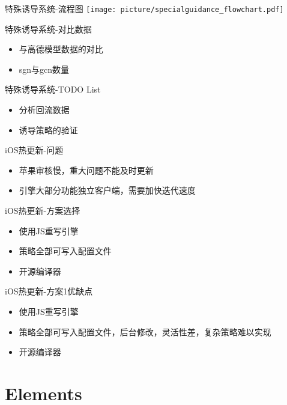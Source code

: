 \documentclass[10pt]{beamer}
\begin{document}
\begin{frame}{特殊诱导系统-流程图}
\texttt{[image: picture/specialguidance\_flowchart.pdf]}
\end{frame}

\begin{frame}{特殊诱导系统-对比数据}
  \begin{itemize}
    \item 与高德模型数据的对比
    \item sgn与gcn数量
  \end{itemize}
\end{frame}

\begin{frame}{特殊诱导系统-TODO List}
  \begin{itemize}
    \item 分析回流数据
    \item 诱导策略的验证
  \end{itemize}
\end{frame}

\begin{frame}{iOS热更新-问题}
  \begin{itemize}
    \item 苹果审核慢，重大问题不能及时更新
    \item 引擎大部分功能独立客户端，需要加快迭代速度
  \end{itemize}
\end{frame}

\begin{frame}{iOS热更新-方案选择}
  \begin{itemize}
    \item 使用JS重写引擎
    \item 策略全部可写入配置文件
	\item 开源编译器
	\end{itemize}
\end{frame}

\begin{frame}{iOS热更新-方案1优缺点}
  \begin{itemize}
    \item 使用JS重写引擎 
    \item 策略全部可写入配置文件，后台修改，灵活性差，复杂策略难以实现
	\item 开源编译器
	\end{itemize}
\end{frame}

\section{Elements}
\end{document}
